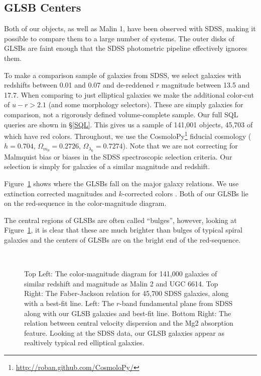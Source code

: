\documentclass[12pt,preprint]{aastex}
\begin{document}
\subsection{GLSB Centers}

Both of our objects, as well as Malin 1, have been observed with SDSS, making it possible to compare them to a large number of systems.  The outer disks of GLSBs are faint enough that the SDSS photometric pipeline effectively ignores them.  

To make a comparison sample of galaxies from SDSS, we select galaxies with redshifts between 0.01 and 0.07 and de-reddened $r$ magnitude between 13.5 and 17.7.  When comparing to just elliptical galaxies we make the additional color-cut of $u-r > 2.1$ (and some morphology selectors).  These are simply galaxies for comparison, not a rigorously defined volume-complete sample.  Our full SQL queries are shown in \S\ref{SQL}.  This gives us a sample of 141,001 objects, 45,703 of which have red colors.  Throughout, we use the CosmoloPy\footnote{\url{http://roban.github.com/CosmoloPy/}} fiducial cosmology ($h=0.704$, $\Omega_{m_0}=0.2726$, $\Omega_{\lambda_0}=0.7274$).  Note that we are not correcting for Malmquist bias or biases in the SDSS spectroscopic selection criteria.  Our selection is simply for galaxies of a similar magnitude and redshift.  


Figure~\ref{elliptical_relations} shows where the GLSBs fall on the major galaxy relations.  We use extinction corrected magnitudes and $k$-corrected colors \citep{Chilingarian10}.  Both of our GLSBs lie on the red-sequence in the color-magnitude diagram.  

The central regions of GLSBs are often called ``bulges'', however, looking at Figure~\ref{elliptical_relations}, it is clear that these are much brighter than bulges of typical spiral galaxies and the centers of GLSBs are on the bright end of the red-sequence.  

\begin{figure}
\\
\caption{
Top Left:  The color-magnitude diagram for 141,000 galaxies of similar redshift and magnitude as Malin 2 and UGC 6614.  Top Right:  The Faber-Jackson relation for 45,700 SDSS galaxies, along with a best-fit line.  Left:  The $r$-band fundamental plane from SDSS along with our GLSB galaxies and best-fit line.  Bottom Right:  The relation between central velocity dispersion and the Mg2 absorption feature.   Looking at the SDSS data, our GLSB galaxies appear as realtively typical red elliptical galaxies.  \label{elliptical_relations}}
\end{figure}
\end{document}

